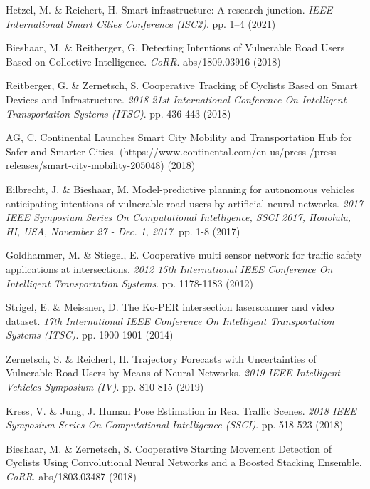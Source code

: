 \begin{thebibliography}{00}

Hetzel, M. \& Reichert, H. Smart infrastructure: A research junction. {\em IEEE International Smart Cities Conference (ISC2)}. pp. 1–4 (2021)

Bieshaar, M. \& Reitberger, G. Detecting Intentions of Vulnerable Road Users Based on Collective Intelligence. {\em CoRR}. abs/1809.03916 (2018)


Reitberger, G. \& Zernetsch, S. Cooperative Tracking of Cyclists Based on Smart Devices and Infrastructure. {\em 2018 21st International Conference On Intelligent Transportation Systems (ITSC)}. pp. 436-443 (2018)


AG, C. Continental Launches Smart City Mobility and Transportation Hub for Safer and Smarter Cities. (https://www.continental.com/en-us/press-/press-releases/smart-city-mobility-205048) (2018)


Eilbrecht, J. \& Bieshaar, M. Model-predictive planning for autonomous vehicles anticipating intentions of vulnerable road users by artificial neural networks. {\em 2017 IEEE Symposium Series On Computational Intelligence, SSCI 2017, Honolulu, HI, USA, November 27 - Dec. 1, 2017}. pp. 1-8 (2017)


Goldhammer, M. \& Stiegel, E. Cooperative multi sensor network for traffic safety applications at intersections. {\em 2012 15th International IEEE Conference On Intelligent Transportation Systems}. pp. 1178-1183 (2012)


Strigel, E. \& Meissner, D. The Ko-PER intersection laserscanner and video dataset. {\em 17th International IEEE Conference On Intelligent Transportation Systems (ITSC)}. pp. 1900-1901 (2014)


Zernetsch, S. \& Reichert, H. Trajectory Forecasts with Uncertainties of Vulnerable Road Users by Means of Neural Networks. {\em 2019 IEEE Intelligent Vehicles Symposium (IV)}. pp. 810-815 (2019)


Kress, V. \& Jung, J. Human Pose Estimation in Real Traffic Scenes. {\em 2018 IEEE Symposium Series On Computational Intelligence (SSCI)}. pp. 518-523 (2018)


Bieshaar, M. \& Zernetsch, S. Cooperative Starting Movement Detection of Cyclists Using Convolutional Neural Networks and a Boosted Stacking Ensemble. {\em CoRR}. abs/1803.03487 (2018)


\end{thebibliography}
